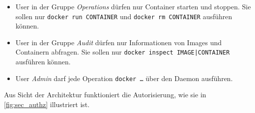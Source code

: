 \documentclass[../main.tex]{subfiles}
\begin{document}
    \begin{itemize}
        \item User in der Gruppe \emph{Operations} dürfen nur Container starten und stoppen. Sie sollen nur \texttt{docker run CONTAINER} und \texttt{docker rm CONTAINER} ausführen können.
        \item User in der Gruppe \emph{Audit} dürfen nur Informationen von Images und Containern abfragen. Sie sollen nur \texttt{docker inspect IMAGE|CONTAINER} ausführen können.
        \item User \emph{Admin} darf jede Operation \texttt{docker \dots} über den Daemon ausführen.
    \end{itemize}

    Aus Sicht der Architektur funktioniert die Autorisierung, wie sie in \fig \ref{fig:sec_authz} illustriert ist.
\end{document}
